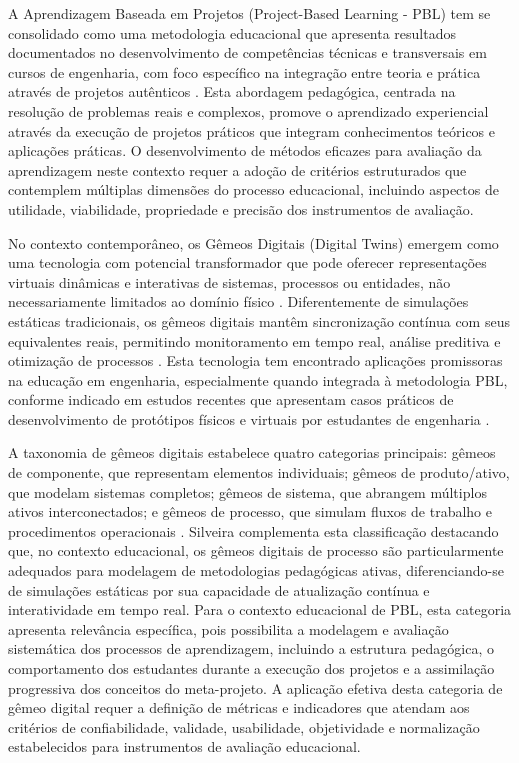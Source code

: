 \documentclass[12pt,a4paper]{article}
\begin{document}
A Aprendizagem Baseada em Projetos (Project-Based Learning - PBL) tem se consolidado como uma metodologia educacional que apresenta resultados documentados no desenvolvimento de competências técnicas e transversais em cursos de engenharia, com foco específico na integração entre teoria e prática através de projetos autênticos \cite{zhang2023, lavado2024, guo2020}. Esta abordagem pedagógica, centrada na resolução de problemas reais e complexos, promove o aprendizado experiencial através da execução de projetos práticos que integram conhecimentos teóricos e aplicações práticas. O desenvolvimento de métodos eficazes para avaliação da aprendizagem neste contexto requer a adoção de critérios estruturados que contemplem múltiplas dimensões do processo educacional, incluindo aspectos de utilidade, viabilidade, propriedade e precisão dos instrumentos de avaliação.

No contexto contemporâneo, os Gêmeos Digitais (Digital Twins) emergem como uma tecnologia com potencial transformador que pode oferecer representações virtuais dinâmicas e interativas de sistemas, processos ou entidades, não necessariamente limitados ao domínio físico \cite{grieves2014, tao2018}. Diferentemente de simulações estáticas tradicionais, os gêmeos digitais mantêm sincronização contínua com seus equivalentes reais, permitindo monitoramento em tempo real, análise preditiva e otimização de processos \cite{silveira2024panorama}. Esta tecnologia tem encontrado aplicações promissoras na educação em engenharia, especialmente quando integrada à metodologia PBL, conforme indicado em estudos recentes que apresentam casos práticos de desenvolvimento de protótipos físicos e virtuais por estudantes de engenharia \cite{bachmann2023}.

A taxonomia de gêmeos digitais estabelece quatro categorias principais: gêmeos de componente, que representam elementos individuais; gêmeos de produto/ativo, que modelam sistemas completos; gêmeos de sistema, que abrangem múltiplos ativos interconectados; e gêmeos de processo, que simulam fluxos de trabalho e procedimentos operacionais \cite{barricelli2019}. Silveira \cite{silveira2024panorama} complementa esta classificação destacando que, no contexto educacional, os gêmeos digitais de processo são particularmente adequados para modelagem de metodologias pedagógicas ativas, diferenciando-se de simulações estáticas por sua capacidade de atualização contínua e interatividade em tempo real. Para o contexto educacional de PBL, esta categoria apresenta relevância específica, pois possibilita a modelagem e avaliação sistemática dos processos de aprendizagem, incluindo a estrutura pedagógica, o comportamento dos estudantes durante a execução dos projetos e a assimilação progressiva dos conceitos do meta-projeto. A aplicação efetiva desta categoria de gêmeo digital requer a definição de métricas e indicadores que atendam aos critérios de confiabilidade, validade, usabilidade, objetividade e normalização estabelecidos para instrumentos de avaliação educacional.
\end{document}
